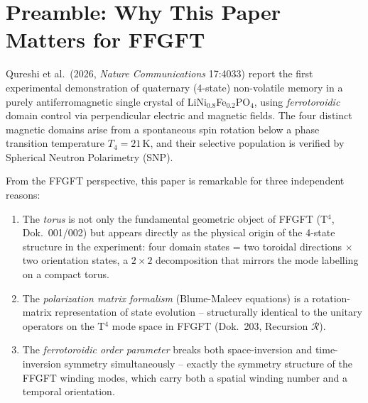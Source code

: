 %
%

\section*{Preamble: Why This Paper Matters for FFGFT}

Qureshi et al.\ (2026, \emph{Nature Communications} 17:4033) report the first
experimental demonstration of quaternary (4-state) non-volatile memory in a
purely antiferromagnetic single crystal of LiNi$_{0.8}$Fe$_{0.2}$PO$_4$, using
\emph{ferrotoroidic} domain control via perpendicular electric and magnetic
fields. The four distinct magnetic domains arise from a spontaneous spin
rotation below a phase transition temperature $T_4 = 21$\,K, and their
selective population is verified by Spherical Neutron Polarimetry (SNP).

From the FFGFT perspective, this paper is remarkable for three independent
reasons:
\begin{enumerate}
  \item The \emph{torus} is not only the fundamental geometric object of
        FFGFT (T$^4$, Dok.~001/002) but appears directly as the physical
        origin of the 4-state structure in the experiment: four domain states
        = two toroidal directions $\times$ two orientation states, a $2\times2$
        decomposition that mirrors the mode labelling on a compact torus.
  \item The \emph{polarization matrix formalism} (Blume-Maleev equations) is
        a rotation-matrix representation of state evolution -- structurally
        identical to the unitary operators on the T$^4$ mode space in FFGFT
        (Dok.~203, Recursion $\mathcal{R}$).
  \item The \emph{ferrotoroidic order parameter} breaks both space-inversion
        and time-inversion symmetry simultaneously -- exactly the symmetry
        structure of the FFGFT winding modes, which carry both a spatial
        winding number and a temporal orientation.
\end{enumerate}


